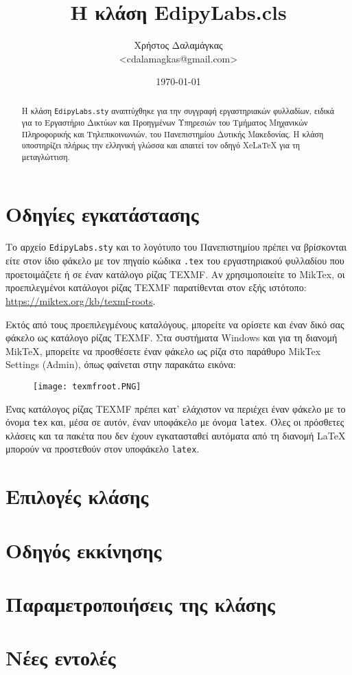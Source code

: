 \documentclass[10pt]{article}
\title{Η κλάση EdipyLabs.cls}
\author{Χρήστος Δαλαμάγκας\\ <cdalamagkas@gmail.com>}
\date{\today}
\begin{document}
	
\maketitle
\thispagestyle{empty}

\begin{abstract}
	H κλάση \texttt{EdipyLabs.sty} αναπτύχθηκε για την συγγραφή εργαστηριακών φυλλαδίων, ειδικά για το Εργαστήριο Δικτύων και Προηγμένων Υπηρεσιών του Τμήματος Μηχανικών Πληροφορικής και Τηλεπικοινωνιών, του Πανεπιστημίου Δυτικής Μακεδονίας. Η κλάση υποστηρίζει πλήρως την ελληνική γλώσσα και απαιτεί τον οδηγό XeLaTeX για τη μεταγλώττιση. 
\end{abstract}
\tableofcontents
	 
\section{Οδηγίες εγκατάστασης}
Το αρχείο \texttt{EdipyLabs.sty} και το λογότυπο του Πανεπιστημίου πρέπει να βρίσκονται είτε στον ίδιο φάκελο με τον πηγαίο κώδικα \texttt{.tex} του εργαστηριακού φυλλαδίου που προετοιμάζετε ή σε έναν κατάλογο ρίζας TEXMF. Αν χρησιμοποιείτε το MikTex, οι προεπιλεγμένοι κατάλογοι ρίζας TEXMF παρατίθενται στον εξής ιστότοπο: \url{https://miktex.org/kb/texmf-roots}.

Εκτός από τους προεπιλεγμένους καταλόγους, μπορείτε να ορίσετε και έναν δικό σας φάκελο ως κατάλογο ρίζας TEXMF. Στα συστήματα Windows και για τη διανομή MikTeX, μπορείτε να προσθέσετε έναν φάκελο ως ρίζα στο παράθυρο MikTex Settings (Admin), όπως φαίνεται στην παρακάτω εικόνα:

\begin{figure}[ht]
 	\centering
 	\texttt{[image: texmfroot.PNG]}
\end{figure}
	 
Ένας κατάλογος ρίζας TEXMF πρέπει κατ' ελάχιστον να περιέχει έναν φάκελο με το όνομα \texttt{tex} και, μέσα σε αυτόν, έναν υποφάκελο με όνομα \texttt{latex}. Όλες οι πρόσθετες κλάσεις και τα πακέτα που δεν έχουν εγκατασταθεί αυτόματα από τη διανομή LaTeX μπορούν να προστεθούν στον υποφάκελο \texttt{latex}. 



\section{Επιλογές κλάσης}

\section{Οδηγός εκκίνησης}

\section{Παραμετροποιήσεις της κλάσης}

\section{Νέες εντολές}
	
\end{document}
